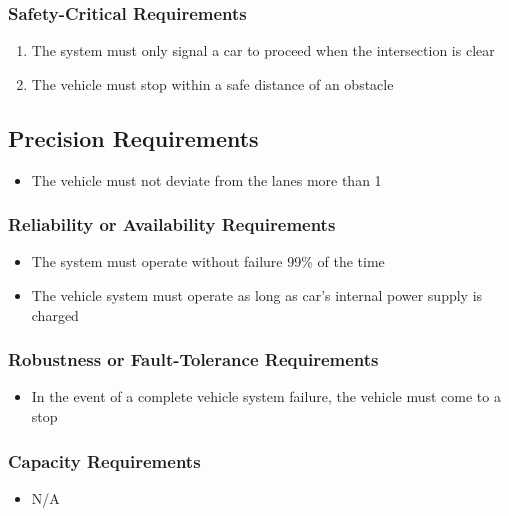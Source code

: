 \documentclass [12pt]{article}
\begin{document}
\subsubsection{Safety-Critical Requirements }
	\begin{enumerate}[label=\textbf{\Alph*}:]
		\item The system must only signal a car to proceed when the intersection is clear
		\item The vehicle must stop within a safe distance of an obstacle
	\end{enumerate}	

\subsection{Precision Requirements}
	\begin{itemize}
		\item The vehicle must not deviate from the lanes more than 1%
	\end{itemize}

\subsubsection{Reliability or Availability  Requirements}
	\begin{itemize}
		\item The system must operate without failure 99\% of the time
		\item The vehicle system must operate as long as car's internal power supply is charged
	\end{itemize}



\subsubsection{Robustness or Fault-Tolerance Requirements }
	\begin{itemize}
		\item In the event of a complete vehicle system failure, the vehicle must come to a stop
	\end{itemize}
	
\subsubsection{Capacity Requirements }
	\begin{itemize}
		\item N/A
	\end{itemize}
\end{document}
